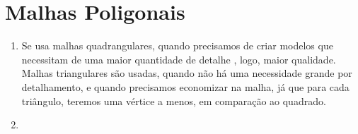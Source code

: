 \section*{Malhas Poligonais}

	\begin{enumerate}\addtocounter{enumi}{7}
	
		\item Se usa malhas quadrangulares, quando precisamos de criar modelos que necessitam
		de uma maior quantidade de detalhe , logo, maior qualidade. Malhas triangulares são usadas,
		quando não há uma necessidade grande por detalhamento, e quando precisamos economizar
		na malha, já que para cada triângulo, teremos uma vértice a menos, em comparação ao
		quadrado.
		
		\item 
		
	\end{enumerate}